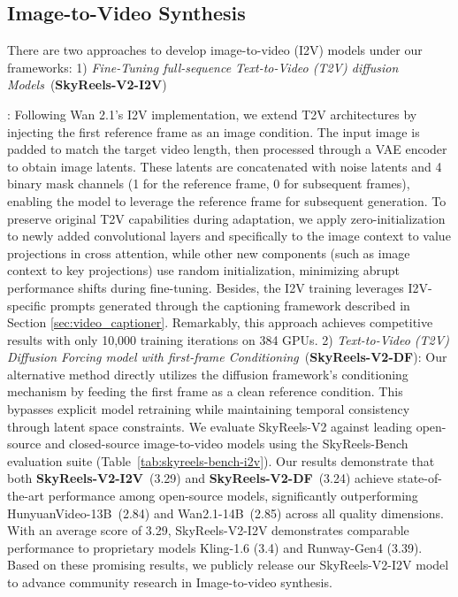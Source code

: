 \documentclass{article}
\begin{document}
{\subsection{Image-to-Video Synthesis}
There are two approaches to develop image-to-video (I2V) models under our frameworks: 1) \emph{Fine-Tuning full-sequence Text-to-Video (T2V) diffusion Models}~(\textbf{SkyReels-V2-I2V})}: Following Wan 2.1's I2V implementation, we extend T2V architectures by injecting the first reference frame as an image condition. The input image is padded to match the target video length, then processed through a VAE encoder to obtain image latents. These latents are concatenated with noise latents and 4 binary mask channels (1 for the reference frame, 0 for subsequent frames), enabling the model to leverage the reference frame for subsequent generation. To preserve original T2V capabilities during adaptation, we apply zero-initialization to newly added convolutional layers and specifically to the image context to value projections in cross attention, while other new components (such as image context to key projections) use random initialization, minimizing abrupt performance shifts during fine-tuning. Besides, the I2V training leverages I2V-specific prompts generated through the captioning framework described in Section \ref{sec:video_captioner}. Remarkably, this approach achieves competitive results with only 10,000 training iterations on 384 GPUs. 2) \emph{Text-to-Video (T2V) Diffusion Forcing model with first-frame Conditioning}~(\textbf{SkyReels-V2-DF}): Our alternative method directly utilizes the diffusion framework's conditioning mechanism by feeding the first frame as a clean reference condition. This bypasses explicit model retraining while maintaining temporal consistency through latent space constraints. We evaluate SkyReels-V2 against leading open-source and closed-source image-to-video models using the SkyReels-Bench evaluation suite (Table~\ref{tab:skyreels-bench-i2v}). Our results demonstrate that both \textbf{SkyReels-V2-I2V}~(3.29) and \textbf{SkyReels-V2-DF}~(3.24) achieve state-of-the-art performance among open-source models, significantly outperforming HunyuanVideo-13B~(2.84) \cite{kong2024hunyuanvideo} and Wan2.1-14B~(2.85) \cite{wan2025} across all quality dimensions. With an average score of 3.29, SkyReels-V2-I2V demonstrates comparable performance to proprietary models Kling-1.6 \cite{kuaishou2024kling} (3.4) and Runway-Gen4 \cite{runwayml2024gen4} (3.39). Based on these promising results, we publicly release our SkyReels-V2-I2V model to advance community research in Image-to-video synthesis.
\end{document}
